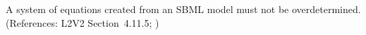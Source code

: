 A system of equations created from an SBML model must not be
overdetermined.  (References: L2V2 Section~4.11.5; )
